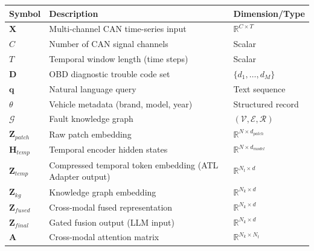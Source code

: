 \documentclass[
  11pt,
]{article}
\newcounter{none} %
\begin{document}
{\def\LTcaptype{none} %
\begin{longtable}[]{@{}
  >{\centering\arraybackslash}p{}
  >{\raggedright\arraybackslash}p{}
  >{\raggedright\arraybackslash}p{}@{}}
\toprule\noalign{}
\begin{minipage}[b]{\linewidth}\centering
Symbol
\end{minipage} & \begin{minipage}[b]{\linewidth}\raggedright
Description
\end{minipage} & \begin{minipage}[b]{\linewidth}\raggedright
Dimension/Type
\end{minipage} \\
\midrule\noalign{}
\endhead
\bottomrule\noalign{}
\endlastfoot
\(\mathbf{X}\) & Multi-channel CAN time-series input &
\(\mathbb{R}^{C \times T}\) \\
\(C\) & Number of CAN signal channels & Scalar \\
\(T\) & Temporal window length (time steps) & Scalar \\
\(\mathbf{D}\) & OBD diagnostic trouble code set &
\(\{d_1, \ldots, d_M\}\) \\
\(\mathbf{q}\) & Natural language query & Text sequence \\
\(\theta\) & Vehicle metadata (brand, model, year) & Structured
record \\
\(\mathcal{G}\) & Fault knowledge graph &
\((\mathcal{V}, \mathcal{E}, \mathcal{R})\) \\
\(\mathbf{Z}_{patch}\) & Raw patch embedding &
\(\mathbb{R}^{N \times d_{patch}}\) \\
\(\mathbf{H}_{temp}\) & Temporal encoder hidden states &
\(\mathbb{R}^{N \times d_{model}}\) \\
\(\mathbf{Z}_{temp}\) & Compressed temporal token embedding (ATL Adapter
output) & \(\mathbb{R}^{N_t \times d}\) \\
\(\mathbf{Z}_{kg}\) & Knowledge graph embedding &
\(\mathbb{R}^{N_k \times d}\) \\
\(\mathbf{Z}_{fused}\) & Cross-modal fused representation &
\(\mathbb{R}^{N_k \times d}\) \\
\(\mathbf{Z}_{final}\) & Gated fusion output (LLM input) &
\(\mathbb{R}^{N_k \times d}\) \\
\(\mathbf{A}\) & Cross-modal attention matrix &
\(\mathbb{R}^{N_k \times N_t}\) \\

\end{longtable}}
\end{document}
